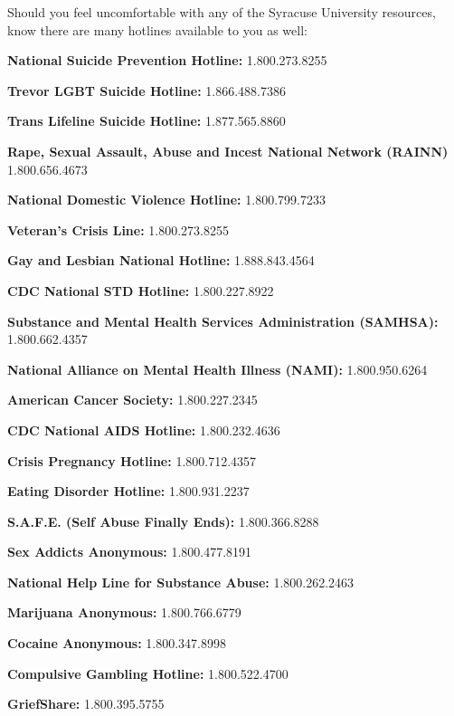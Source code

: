 \documentclass[11pt,a4paper]{article}
\newcommand{\pspace}{\par\vspace{\baselineskip}}
\begin{document}
Should you feel uncomfortable with any of the Syracuse University resources, know there are many hotlines available to you as well: \pspace

\noindent\textbf{National Suicide Prevention Hotline:} 1.800.273.8255 \pspace

\noindent\textbf{Trevor LGBT Suicide Hotline:} 1.866.488.7386 \pspace

\noindent\textbf{Trans Lifeline Suicide Hotline:} 1.877.565.8860 \pspace

\noindent\textbf{Rape, Sexual Assault, Abuse and Incest National Network (RAINN)} 1.800.656.4673 \pspace

\noindent\textbf{National Domestic Violence Hotline:} 1.800.799.7233 \pspace

\noindent\textbf{Veteran's Crisis Line:} 1.800.273.8255 \pspace

\noindent\textbf{Gay and Lesbian National Hotline:} 1.888.843.4564 \pspace

\noindent\textbf{CDC National STD Hotline:} 1.800.227.8922 \pspace

\noindent\textbf{Substance and Mental Health Services Administration (SAMHSA):} 1.800.662.4357 \pspace

\noindent\textbf{National Alliance on Mental Health Illness (NAMI):} 1.800.950.6264 \pspace

\noindent\textbf{American Cancer Society:} 1.800.227.2345 \pspace

\noindent\textbf{CDC National AIDS Hotline:} 1.800.232.4636 \pspace

\noindent\textbf{Crisis Pregnancy Hotline:} 1.800.712.4357 \pspace

\noindent\textbf{Eating Disorder Hotline:} 1.800.931.2237 \pspace

\noindent\textbf{S.A.F.E. (Self Abuse Finally Ends):} 1.800.366.8288 \pspace

\noindent\textbf{Sex Addicts Anonymous:} 1.800.477.8191 \pspace

\noindent\textbf{National Help Line for Substance Abuse:} 1.800.262.2463 \pspace

\noindent\textbf{Marijuana Anonymous:} 1.800.766.6779 \pspace

\noindent\textbf{Cocaine Anonymous:} 1.800.347.8998 \pspace

\noindent\textbf{Compulsive Gambling Hotline:} 1.800.522.4700 \pspace

\noindent\textbf{GriefShare:} 1.800.395.5755
\end{document}
